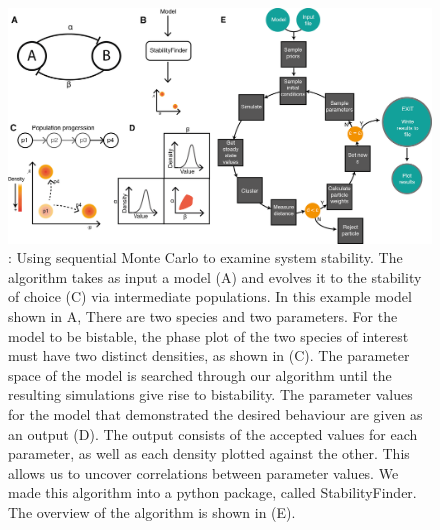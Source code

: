 \begin{figure}[h]
\begin{center}
\includegraphics[scale=0.9]{chapterStabilityFinder/images/figure-01.png}
\caption[LoF caption]{\label{fig:fig1}: Using sequential Monte Carlo to examine system stability. The algorithm takes as input a model (A) and evolves it to the stability of choice (C) via intermediate populations. In this example model shown in A, There are two species and two parameters. For the model to be bistable, the phase plot of the two species of interest must have two distinct densities, as shown in (C). The parameter space of the model is searched through our algorithm until the resulting simulations give rise to bistability. The parameter values for the model that demonstrated the desired behaviour are given as an output (D). The output consists of the accepted values for each parameter, as well as each density plotted against the other. This allows us to uncover correlations between parameter values. We made this algorithm into a python package, called StabilityFinder. The overview of the algorithm is shown in (E).}
\end{center}
\end{figure}
\clearpage

